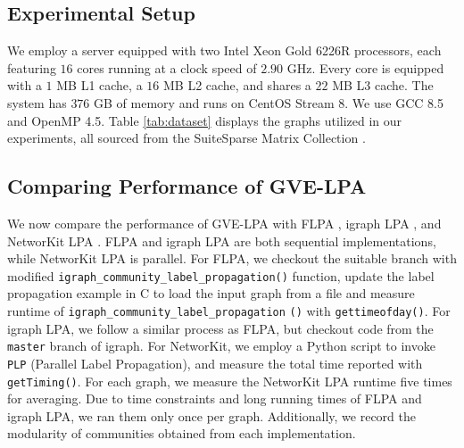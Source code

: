 \subsection{Experimental Setup}
\label{sec:setup}

We employ a server equipped with two Intel Xeon Gold 6226R processors, each featuring $16$ cores running at a clock speed of $2.90$ GHz. Every core is equipped with a $1$ MB L1 cache, a $16$ MB L2 cache, and shares a $22$ MB L3 cache. The system has $376$ GB of memory and runs on CentOS Stream 8. We use GCC 8.5 and OpenMP 4.5. Table \ref{tab:dataset} displays the graphs utilized in our experiments, all sourced from the SuiteSparse Matrix Collection \cite{suite19}.








\subsection{Comparing Performance of GVE-LPA}

We now compare the performance of GVE-LPA with FLPA \cite{traag2023large}, igraph LPA \cite{csardi2006igraph}, and NetworKit LPA \cite{staudt2016networkit}. FLPA and igraph LPA are both sequential implementations, while NetworKit LPA is parallel. For FLPA, we checkout the suitable branch with modified \texttt{igraph\_community\_label\_propagation()} function, update the label propagation example in C to load the input graph from a file and measure runtime of \texttt{igraph\_community\_label\_propagation} \texttt{()} with \texttt{gettimeofday()}. For igraph LPA, we follow a similar process as FLPA, but checkout code from the \texttt{master} branch of igraph. For NetworKit, we employ a Python script to invoke \texttt{PLP} (Parallel Label Propagation), and measure the total time reported with \texttt{getTiming()}. For each graph, we measure the NetworKit LPA runtime five times for averaging. Due to time constraints and long running times of FLPA and igraph LPA, we ran them only once per graph. Additionally, we record the modularity of communities obtained from each implementation.

